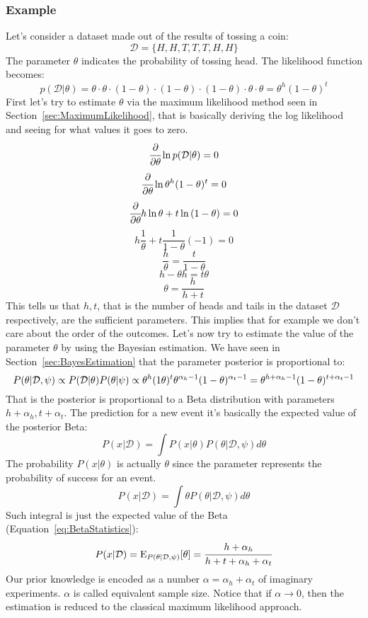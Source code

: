 \subsubsection{Example}
Let's consider a dataset made out of the results of tossing a coin:
\[
\mathcal{D}=\{H,H,T,T,T,H,H\}
\]
The parameter $\theta$ indicates the probability of tossing head. The likelihood function becomes:
\[
	p(\mathcal{D}\vert\theta)=\theta\cdot\theta\cdot(1-\theta)\cdot(1-\theta)\cdot(1-\theta)\cdot\theta\cdot\theta=\theta^h(1-\theta)^t
\]
First let's try to estimate $\theta$ via the maximum likelihood method seen in Section~\ref{sec:MaximumLikelihood}, that is basically deriving the log likelihood and seeing for what values it goes to zero.
\[
\cfrac{\partial}{\partial\theta}\ln{p(\mathcal{D}\vert\theta)}=0
\]
\[
\cfrac{\partial}{\partial\theta}\ln{\theta^h(1-\theta)^t}=0
\]
\[
\cfrac{\partial}{\partial\theta}h\ln{\theta}+t\ln{(1-\theta)}=0
\]
\[
h\frac{1}{\theta}+t\frac{1}{1-\theta}(-1)=0
\]
\[
\frac{h}{\theta}=\frac{t}{1-\theta}
\]
\[
h-\theta h=t\theta
\]
\[
\theta=\frac{h}{h+t}
\]
This tells us that $h,t$, that is the number of heads and tails in the dataset $\mathcal{D}$ respectively, are the sufficient parameters. This implies that for example we don't care about the order of the outcomes.\newline
Let's now try to estimate the value of the parameter $\theta$ by using the Bayesian estimation. We have seen in Section~\ref{sec:BayesEstimation} that the parameter posterior is proportional to:
\[
P(\theta\vert\mathcal{D},\psi)\propto P(\mathcal{D}\vert\theta)P(\theta\vert\psi)\propto\theta^h(1\-\theta)^t\theta^{\alpha_h-1}(1-\theta)^{\alpha_t-1}=\theta^{h+\alpha_h-1}(1-\theta)^{t+\alpha_t-1}
\]
That is the posterior is proportional to a Beta distribution with parameters $h+\alpha_h, t+\alpha_t$. \newline
The prediction for a new event it's basically the expected value of the posterior Beta: %
\[
P(x\vert\mathcal{D})=\int P(x\vert\theta)P(\theta\vert\mathcal{D},\psi)d\theta
\]
The probability $P(x\vert\theta)$ is actually $\theta$ since the parameter represents the probability of success for an event. 
\[
P(x\vert\mathcal{D})=\int\theta P(\theta\vert\mathcal{D},\psi)d\theta
\]
Such integral is just the expected value of the Beta (Equation~\ref{eq:BetaStatistics}):
\[
P(x\vert\mathcal{D})=\text{E}_{P(\theta\vert\mathcal{D},\psi)}[\theta]=\cfrac{h+\alpha_h}{h+t+\alpha_h+\alpha_t}
\]
Our prior knowledge is encoded as a number $\alpha=\alpha_h+\alpha_t$ of imaginary experiments. $\alpha$ is called equivalent sample size. Notice that if $\alpha\rightarrow 0$, then the estimation is reduced to the classical maximum likelihood approach. 
%
%
